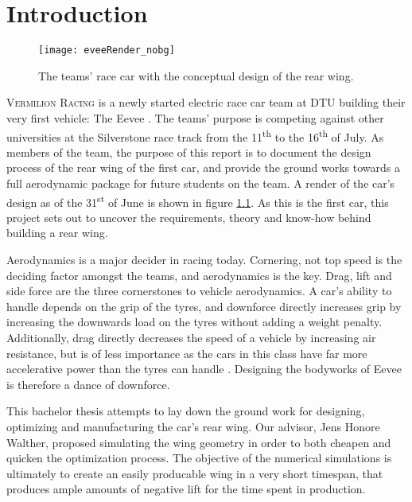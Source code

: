 \chapter{Introduction}

  \begin{figure}
    \texttt{[image: eveeRender\_nobg]}
    \caption{The teams' race car with the conceptual design of the rear wing.}
    \label{fig:EeveeRender}
  \end{figure}

  \textsc{Vermilion Racing} is a newly started electric race car team at DTU building their very first vehicle: The Eevee \cite{bulba}. The teams' purpose is competing against other universities at the Silverstone race track from the 11\textsuperscript{th} to the 16\textsuperscript{th} of July. As members of the team, the purpose of this report is to document the design process of the rear wing of the first car, and provide the ground works towards a full aerodynamic package for future students on the team. A render of the car's design as of the 31\textsuperscript{st} of June is shown in figure \ref{fig:EeveeRender}. As this is the first car, this project sets out to uncover the requirements, theory and know-how behind building a rear wing.

  Aerodynamics is a major decider in racing today. Cornering, not top speed is the deciding factor amongst the teams, and aerodynamics is the key. Drag, lift and side force are the three cornerstones to vehicle aerodynamics. A car's ability to handle depends on the grip of the tyres, and downforce directly increases grip by increasing the downwards load on the tyres without adding a weight penalty. Additionally, drag directly decreases the speed of a vehicle by increasing air resistance, but is of less importance as the cars in this class have far more accelerative power than the tyres can handle \cite{jkatz}. Designing the bodyworks of Eevee is therefore a dance of downforce.

  This bachelor thesis attempts to lay down the ground work for designing, optimizing and manufacturing the car's rear wing. Our advisor, Jens Honore Walther, proposed simulating the wing geometry in order to both cheapen and quicken the optimization process. The objective of the numerical simulations is ultimately to create an easily producable wing in a very short timespan, that produces ample amounts of negative lift for the time spent in production.

